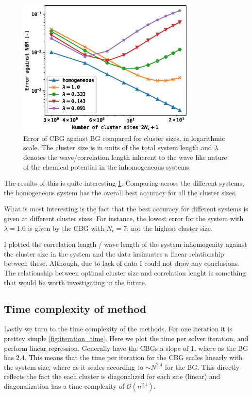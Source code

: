\documentclass[11pt]{article}
\begin{document}
\begin{figure}[ht!]
	\centering
	\includegraphics[width=0.8\textwidth]{figures/err_multiple_systems.eps}
	\caption{Error of CBG against BG compared for cluster sizes, in logarithmic scale. The cluster size is in units of the total system length and $\lambda$ denotes the wave/correlation length inherent to the wave like nature of the chemical potential in the inhomogeneous systems. }
	\label{fig:err_multiple_systems}
\end{figure}

The results of this is quite interesting \ref{fig:err_multiple_systems}. Comparing across the different systems, the homogeneous system has the overall best accuracy for all the cluster sizes. 

What is most interesting is the fact that the best accuracy for different systems is given at different cluster sizes. For instance, the lowest error for the system with $\lambda=1.0$ is given by the CBG with $N_c=7$, not the highest cluster size.

I plotted the correlation length / wave length of the system inhomogenity against the cluster size in the system and the data insinuates a linear relationship between these. Although, due to lack of data I could not draw any conclusions. The relationship between optimal cluster size and correlation lenght is something that would be worth investigating in the future. 


\subsection{Time complexity of method}

Lastly we turn to the time complexity of the methods. For one iteration it is prettey simple \ref{fig:iteration_time}. Here we plot the time per solver iteration, and perform linear regression. Generally have the CBGs a slope of $1$, where as the BG has $2.4$. This means that the time per iteration for the CBG scales linearly with the system size, where as it scales according to $\sim N^{2.4}$ for the BG. This directly reflects the fact the each cluster is diagonalized for each site (linear) and diagonalization has a time complexity of $\mathcal{O} (n^{2.4})$. 
\end{document}
